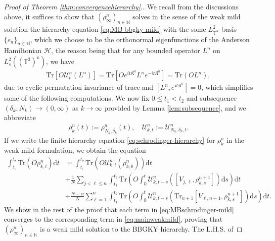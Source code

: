 \begin{proof}[Proof of Theorem \ref{thm:convergencehierarchy}.]
  We recall from the discussions above, it suffices to show that
  $(\rho^n_{\infty})_{n \in \mathbb{N}}$ solves in the sense of the weak mild solution 
  the hierarchy equation \eqref{eq:MB-bbgky-mild} with the
  some $L_{\mathbb{T}^3}^2$--basis $\{ e_n \}_{n \in \mathbb{N}}$, which we choose to be the
 orthonormal eigenfunctions of the Anderson Hamiltonian
  $\mathcal{H}$, the reason being that for any bounded operator $L^n$ on $L_s^2((\mathbb{T}^3)^n)$, we have 
  \begin{align}\label{eq:commutation-O-Ln}
  \mathrm{Tr}[O\mathcal{U}^n_t(L^n)] = \mathrm{Tr}\left[Oe^{it\mathfrak{K}^n}L^ne^{-it\mathfrak{K}^n}\right] =  \mathrm{Tr}(OL^n),
 \end{align}
 due to cyclic permutation invariance of trace and $[L^n,e^{it\mathfrak{K}^n}] = 0$, which simplifies some of the following computations. We now fix $0 \leqslant t_1 < t_2$ and subsequence $(\delta_{k},N_{k}) \to (0,\infty)$ as $k \to \infty$ provided by Lemma \ref{lem:subsequence}, and we abbreviate
  \begin{align}
    \rho^n_k (t) := \rho^n_{N_k, \delta_k} (t),
    \quad \mathcal{U}^n_{k, t}  :=
    \mathcal{U}^n_{N_k, \delta_k, t} . \label{eq:abbrev-rho-U}
  \end{align}
  If we write the finite hierarchy equation \eqref{eq:schrodinger-hierarchy} for
  $\rho_k^n$ in the weak mild formulation, we obtain the equation
  \begin{align} 
    \int_{t_1}^{t_2} \mathrm{Tr} (O \rho^n_{k, t}) \mathrm{d} t & =
    \int_{t_1}^{t_2} \mathrm{Tr} (O \mathcal{U}^n_{k, t} (\rho^n_{k,
    0})) \mathrm{d} t \nonumber\\
    & + \frac{1}{N} \sum_{j < \ell \leqslant n} \int_{t_1}^{t_2} \mathrm{Tr}
    \left( O \int^t_0 \mathcal{U}^n_{k, t - s} ([V_{j, \ell}, \rho^{n +
    1}_{k, s}]) \mathrm{d} s \right) \mathrm{d} t \nonumber\\
    & + \frac{N - n}{N} \sum_{\ell = 1}^n \int_{t_1}^{t_2} \mathrm{Tr}
    \left( O \int^t_0 \mathcal{U}^n_{k, t - s} (\mathrm{Tr}_{n + 1}
    [V_{\ell, n + 1}, \rho^{n + 1}_{k, s}]) \mathrm{d} s \right) \mathrm{d} t. \label{eq:MBschrodinger-mild}
  \end{align}
  We show in the rest of the proof that each term in
  \eqref{eq:MBschrodinger-mild} converges to the corresponding term in
  \eqref{eq:mainweakmild}, proving that $(\rho^n_{\infty})_{n \in \mathbb{N}}$
  is a weak mild solution to the BBGKY hierarchy. The L.H.S. of

\end{proof}
